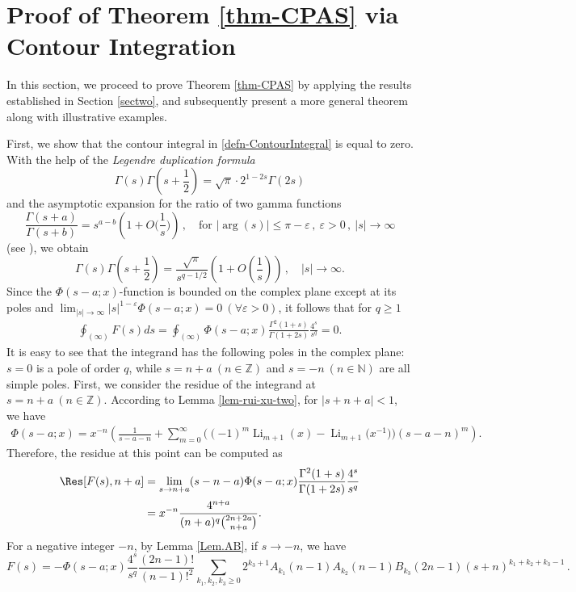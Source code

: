 \documentclass[11pt]{article}
\let\oldsection\section
\renewcommand\section{\setcounter{equation}{0}\oldsection}
\DeclareMathOperator{\Li}{Li}
\def\N{\mathbb{N}}
\def\Z{\mathbb{Z}}
\theoremstyle{plain}
\theoremstyle{definition}
\begin{document}
\section{Proof of Theorem \ref{thm-CPAS} via Contour Integration}

In this section, we proceed to prove Theorem \ref{thm-CPAS} by applying the results established in Section \ref{sectwo}, and subsequently present a more general theorem along with illustrative examples.

First, we show that the contour integral in \eqref{defn-ContourIntegral} is equal to zero.
With the help of the \emph{Legendre duplication formula}
\[
\Gamma(s)\Gamma\left(s+\frac{1}{2}\right)=\sqrt{\pi}\cdot 2^{1-2s}\Gamma(2s)
\]
and the asymptotic expansion for the ratio of two gamma functions
\[
\frac{\Gamma(s+a)}{\Gamma(s+b)}
    =s^{a-b}\left(1+O\Big(\frac{1}{s}\Big)\right)\,,
    \quad\text{for } |\arg(s)|\leq\pi-\varepsilon\,,\ \varepsilon>0\,,\ |s|\to\infty
\]
(see \cite[Sections 2.3 and 2.11]{Luke69.1}), we obtain
\[
\Gamma(s)\Gamma\left(s+\frac{1}{2}\right)=\frac{\sqrt{\pi}}{s^{q-1/2}}\left(1+O\left(\frac{1}{s}\right)\right)\,,\quad |s|\to\infty.
\]
Since the $\Phi(s-a;x)$-function is bounded on the complex plane except at its poles and $\lim_{|s|\rightarrow \infty} |s|^{1-\varepsilon}\Phi(s-a;x)=0\ (\forall \varepsilon>0) $, it follows that for $q\geq 1$
\begin{align*}
\oint_{(\infty)} F(s) ds=\oint_{(\infty)} \Phi(s-a;x) \frac{\Gamma^2(1+s)}{\Gamma(1+2s)}\frac{4^s}{s^q}=0.
\end{align*}
It is easy to see that the integrand has the following poles in the complex plane: $s=0$ is a pole of order $q$, while $s=n+a\ (n\in\Z)$ and $s=-n\ (n\in\N)$ are all simple poles. First, we consider the residue of the integrand at $s=n+a\ (n\in\Z)$. According to Lemma \ref{lem-rui-xu-two}, for $|s+n+a|<1$, we have
\begin{align*}
\Phi(s-a;x)=x^{-n} \left(\frac1{s-a-n}+\sum_{m=0}^\infty \Big((-1)^m\Li_{m+1}(x)-\Li_{m+1}\Big(x^{-1}\Big)\Big)(s-a-n)^m \right).
\end{align*}
Therefore, the residue at this point can be computed as
\begin{align*}
\Res[F(s),n+a]&=\lim_{s\rightarrow n+a} (s-n-a)\Phi(s-a;x) \frac{\Gamma^2(1+s)}{\Gamma(1+2s)}\frac{4^s}{s^q}\\
&=x^{-n} \frac{4^{n+a}}{(n+a)^q\binom{2n+2a}{n+a}}.
\end{align*}
For a negative integer $-n$, by Lemma \ref{Lem.AB}, if $s\to -n$, we have
\[
F(s)=-\Phi(s-a;x)\frac{4^s}{s^q}\frac{(2n-1)!}{(n-1)!^2}
    \sum_{k_1,k_2,k_3\geq0}2^{k_3+1}A_{k_1}(n-1)A_{k_2}(n-1)B_{k_3}(2n-1)
    (s+n)^{k_1+k_2+k_3-1}\,.
\]
\end{document}
